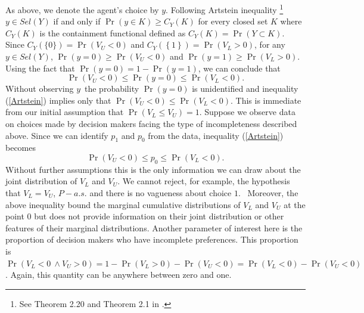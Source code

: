 \documentclass[reqno]{article}
\renewcommand{\cite}{\citet}
\begin{document}
As above, we denote the agent's choice by $y$. Following Artstein inequality
\footnote{See \cite{Molchanov2005} Theorem 2.20 and Theorem 2.1 in \cite{BMM2012}.}
$y\in Sel\left( Y\right) $ if and only if $\Pr \left( y\in K\right) \geq
C_{Y}\left( K\right) $ for every closed set $K$ where $C_{Y}\left( K\right) $ is the containment functional defined as $C_{Y}\left( K\right) =\Pr \left( Y\subset K\right) $. Since $C_{Y}\left( \{0\}\right) =\Pr \left(
V_{U}<0\right) $ and $C_{Y}\left( \left\{ 1\right\} \right) =\Pr \left(
V_{L}>0\right) $, for any $y\in Sel\left( Y\right) $, $\Pr (y=0)\geq \Pr
\left( V_{U}<0\right) $ and $\Pr \left( y=1\right) \geq \Pr \left(
V_{L}>0\right) $. Using the fact that $\Pr \left( y=0\right) =1-\Pr (y=1)$,
we can conclude that
\begin{equation}
\Pr \left( V_{U}<0\right) \leq \Pr (y=0)\leq \Pr \left( V_{L}<0\right) .
\label{Artstein}
\end{equation}%
Without observing $y$\ the probability $\Pr \left( y=0\right) $ is
unidentified and inequality (\ref{Artstein}) implies only that $\Pr \left(
V_{U}<0\right) \leq \Pr \left( V_{L}<0\right) $. This is immediate from our
initial assumption that $\Pr \left( V_{L}\leq V_{U}\right) =1$. Suppose we
observe data on choices made by decision makers facing the type of
incompleteness described above. Since we can identify $p_{1}$ and $p_{0}$
from the data, inequality (\ref{Artstein}) becomes%
\begin{equation}
\Pr \left( V_{U}<0\right) \leq p_{0}\leq \Pr \left( V_{L}<0\right) .
\label{ineq1}
\end{equation}%
Without further assumptions this is the only information we can draw about
the joint distribution of $V_{L}$ and $V_{U}$. We cannot reject, for
example, the hypothesis that $V_{L}=V_{U}$, $P-a.s.$ and there is no
vagueness about choice $1$. \ Moreover, the above inequality bound the
marginal cumulative distributions of $V_{L}$ and $V_{U}$ at the point $0$
but does not provide information on their joint distribution or other
features of their marginal distributions. Another parameter of interest here
is the proportion of decision makers who have incomplete preferences. This
proportion is $\Pr \left( V_{L}<0\ \wedge V_{U}>0\right) =1-\Pr \left(
V_{L}>0\right) -\Pr \left( V_{U}<0\right) =\Pr \left( V_{L}<0\right) -\Pr
\left( V_{U}<0\right) $. Again, this quantity can be anywhere between zero
and one.
\end{document}
